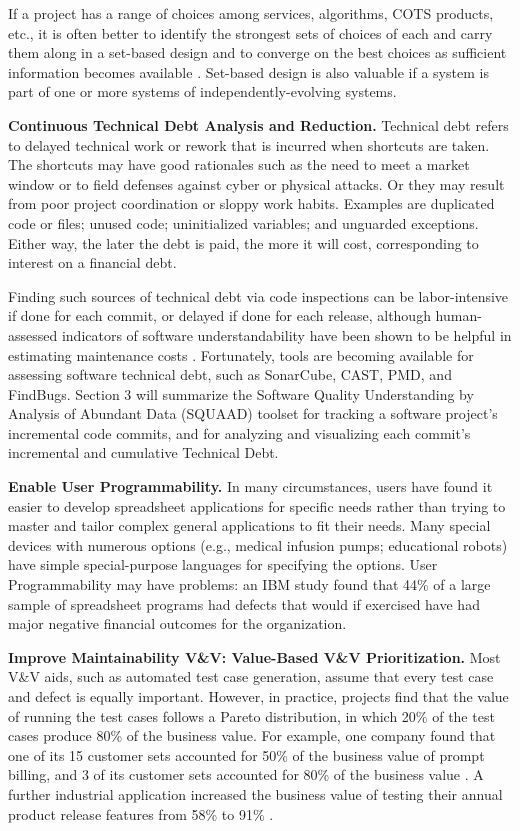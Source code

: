 If a project has a range of choices among services, algorithms, COTS products, etc., it is often better to identify the strongest sets of choices of each and carry them along in a set-based design and to converge on the best choices as sufficient information becomes available 
\cite{bernstein1998design,reinertsten2009principles}.  Set-based design is also valuable if a system is part of one or more systems of independently-evolving systems.

\textbf{Continuous Technical Debt Analysis and Reduction.}  Technical debt refers to delayed technical work or rework that is incurred when shortcuts are taken.  The shortcuts may have good rationales such as the need to meet a market window or to field defenses against cyber or physical attacks.  Or they may result from poor project coordination or sloppy work habits.  Examples are duplicated code or files; unused code; uninitialized variables; and unguarded exceptions.  Either way, the later the debt is paid, the more it will cost, corresponding to interest on a financial debt.

Finding such sources of technical debt via code inspections can be labor-intensive if done for each commit, or delayed if done for each release, although human-assessed indicators of software understandability have been shown to be helpful in estimating maintenance costs \cite{chen2016evaluating}.  Fortunately, tools are becoming available for assessing software technical debt, such as SonarCube, CAST, PMD, and FindBugs.  Section 3 will summarize the Software Quality Understanding by Analysis of Abundant Data (SQUAAD) toolset for tracking a software project's incremental code commits, and for analyzing and visualizing each commit's incremental and cumulative Technical Debt.

\textbf{Enable User Programmability.} In many circumstances, users have found it easier to develop spreadsheet applications for specific needs rather than trying to master and tailor complex general applications to fit their needs.   Many special devices with numerous options (e.g., medical infusion pumps; educational robots) have simple special-purpose languages for specifying the options.  User Programmability may have problems: an IBM study found that 44\% of a large sample of spreadsheet programs had defects that would if exercised have had major negative financial outcomes for the organization.

\textbf{Improve Maintainability V\&V: Value-Based V\&V Prioritization.}  Most V\&V aids, such as automated test case generation, assume that every test case and defect is equally important.  However, in practice, projects find that the value of running the test cases follows a Pareto distribution, in which 20\% of the test cases produce 80\% of the business value.  For example, one company found that one of its 15 customer sets accounted for 50\% of the business value of prompt billing, and 3 of its customer sets accounted for 80\% of the business value \cite{bullock2000calculating}.   A further industrial application increased the business value of testing their annual product release features from 58\% to 91\% \cite{li2012value}.

